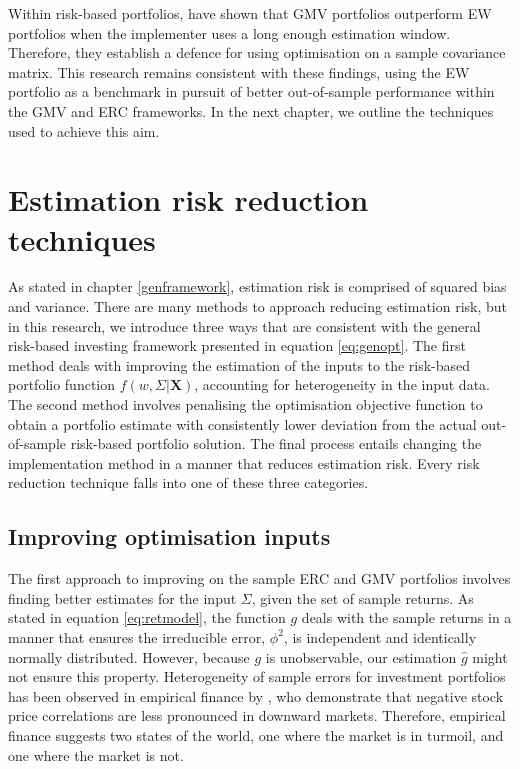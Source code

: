 \documentclass[
]{article}
\begin{document}
Within risk-based portfolios, \citet{K10} have shown that GMV portfolios outperform EW portfolios when the
implementer uses a long enough estimation window. Therefore, they establish a defence for using
optimisation on a sample covariance matrix. This research remains consistent with these findings,
using the EW portfolio as a benchmark in pursuit of better out-of-sample performance within the GMV
and ERC frameworks. In the next chapter, we outline the techniques used to achieve this aim.

\hypertarget{estriskreduce}{%
\section{Estimation risk reduction techniques}\label{estriskreduce}}

As stated in chapter \ref{genframework}, estimation risk is comprised of squared bias and variance.
There are many methods to approach reducing estimation risk, but in this research, we introduce three
ways that are consistent with the general risk-based investing framework presented in equation
\eqref{eq:genopt}. The first method deals with improving the estimation of the inputs to the risk-based
portfolio function \(f(w, \Sigma|\textbf{X})\), accounting for heterogeneity in the input data. The
second method involves penalising the optimisation objective function to obtain a portfolio estimate
with consistently lower deviation from the actual out-of-sample risk-based portfolio solution. The
final process entails changing the implementation method in a manner that reduces estimation risk.
Every risk reduction technique falls into one of these three categories.

\hypertarget{improving-optimisation-inputs}{%
\subsection{Improving optimisation inputs}\label{improving-optimisation-inputs}}

The first approach to improving on the sample ERC and GMV portfolios involves finding better estimates
for the input \(\Sigma\), given the set of sample returns. As stated in equation \eqref{eq:retmodel},
the function \(g\) deals with the sample returns in a manner that ensures the irreducible error,
\(\phi^2\), is independent and identically normally distributed. However, because \(g\) is unobservable,
our estimation \(\hat{g}\) might not ensure this property. Heterogeneity of sample errors for investment
portfolios has been observed in empirical finance by \citet{AC02}, who demonstrate that negative stock
price correlations are less pronounced in downward markets. Therefore, empirical finance suggests two
states of the world, one where the market is in turmoil, and one where the market is not.
\end{document}
